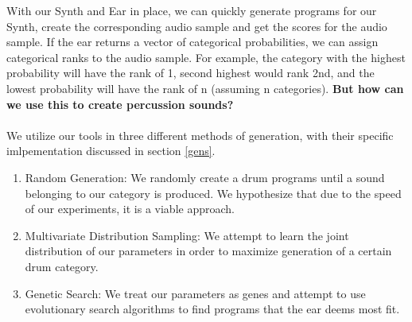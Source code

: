 \documentclass{nime-alternate} %
\begin{document}
With our Synth and Ear in place, we can quickly generate programs for our Synth, create the corresponding audio sample and get the scores for the audio sample. If the ear returns a vector of categorical probabilities, we can assign categorical ranks to the audio sample. For example, the category with the highest probability will have the rank of 1, second highest would rank 2nd, and the lowest probability will have the rank of n (assuming n categories).\textbf{
But how can we use this to create percussion sounds?}\\\\
We utilize our tools in three different methods of generation, with their specific imlpementation discussed in section \ref{gens}.
\begin {enumerate} [label=(\roman*)]
\item Random Generation: We randomly create a drum programs until a sound belonging to our category is produced. We hypothesize that due to the speed of our experiments, it is a viable approach.
\item Multivariate Distribution Sampling: We attempt to learn the joint distribution of our parameters in order to maximize generation of a certain drum category. 
\item Genetic Search: We treat our parameters as genes and attempt to use evolutionary search algorithms to find programs that the ear deems most fit.\\
\end {enumerate} 
\end{document}
